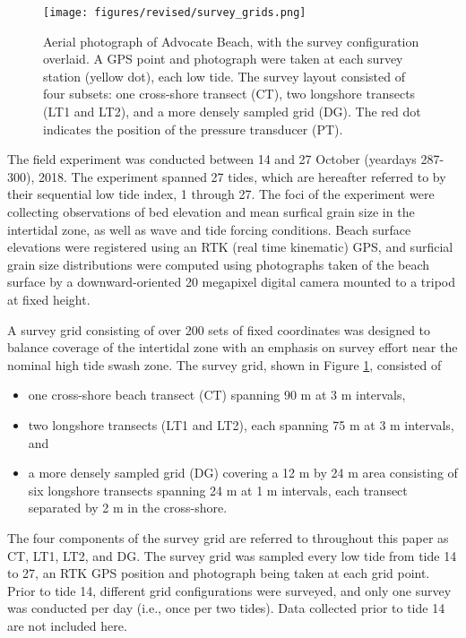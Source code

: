\documentclass[jmse,article,submit,pdftex,moreauthors]{Definitions/mdpi}
\begin{document}
\begin{figure}[tbp] %
	\texttt{[image: figures/revised/survey\_grids.png]}
	\caption[Advocate Beach aerial photograph and survey grid configuration]{Aerial photograph of Advocate Beach, with the survey configuration overlaid. A GPS point and photograph were taken at each survey station (yellow dot), each low tide. The survey layout consisted of four subsets: one cross-shore transect (CT), two longshore transects (LT1 and LT2), and a more densely sampled grid (DG). The red dot indicates the position of the pressure transducer (PT). \label{fig:survey_grids}}
\end{figure}

The field experiment was conducted between 14 and 27 October (yeardays 287-300), 2018. The experiment spanned 27 tides, which are hereafter referred to by their sequential low tide index, 1 through 27. The foci of the experiment were collecting observations of bed elevation and mean surfical grain size in the intertidal zone, as well as wave and tide forcing conditions. Beach surface elevations were registered using an RTK (real time kinematic) GPS, and surficial grain size distributions were computed using photographs taken of the beach surface by a downward-oriented 20 megapixel digital camera mounted to a tripod at fixed height. 

A survey grid consisting of over 200 sets of fixed coordinates was designed to balance coverage of the intertidal zone with an emphasis on survey effort near the nominal high tide swash zone. The survey grid, shown in Figure \ref{fig:survey_grids}, consisted of

\begin{itemize}
	\item one cross-shore beach transect (CT) spanning 90 m at 3 m intervals,
	\item two longshore transects (LT1 and LT2), each spanning 75 m at 3 m intervals, and 
	\item a more densely sampled grid (DG) covering a 12 m by 24 m area consisting of six longshore transects spanning 24 m at 1 m intervals, each transect separated by 2 m in the cross-shore.
\end{itemize}

The four components of the survey grid are referred to throughout this paper as CT, LT1, LT2, and DG. The survey grid was sampled every low tide from tide 14 to 27, an RTK GPS position and photograph being taken at each grid point. Prior to tide 14, different grid configurations were surveyed, and only one survey was conducted per day (i.e., once per two tides). Data collected prior to tide 14 are not included here. 
\end{document}
